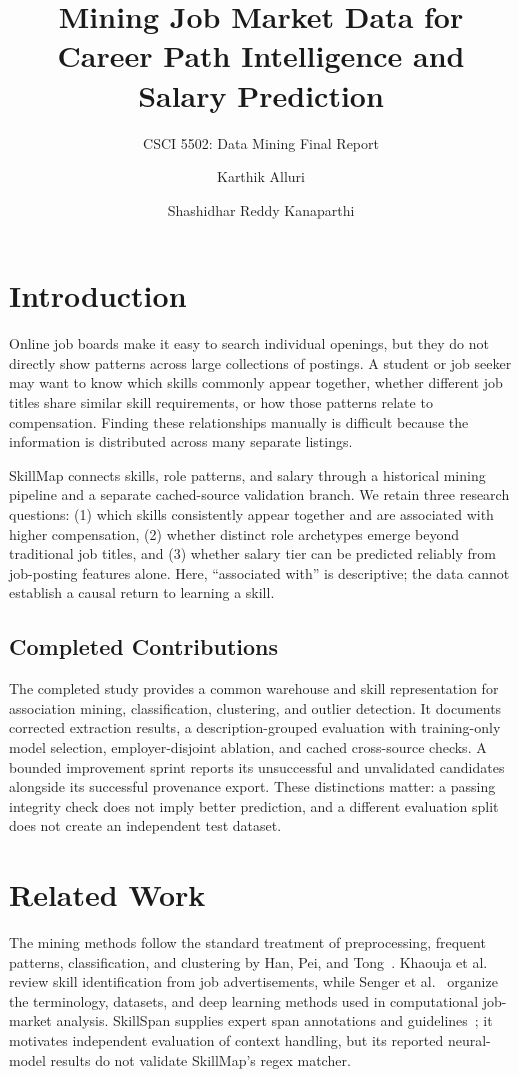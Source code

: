 \documentclass[sigconf,nonacm]{acmart}
\title{Mining Job Market Data for Career Path Intelligence and Salary Prediction}
\subtitle{CSCI 5502: Data Mining Final Report}
\author{Karthik Alluri}
\affiliation{%
  \institution{University of Colorado Boulder}
  \city{Boulder}
  \state{Colorado}
  \country{USA}}
\author{Shashidhar Reddy Kanaparthi}
\affiliation{%
  \institution{University of Colorado Boulder}
  \city{Boulder}
  \state{Colorado}
  \country{USA}}
\begin{document}
\maketitle

\section{Introduction}
Online job boards make it easy to search individual openings, but they do not directly show patterns across large collections of postings. A student or job seeker may want to know which skills commonly appear together, whether different job titles share similar skill requirements, or how those patterns relate to compensation. Finding these relationships manually is difficult because the information is distributed across many separate listings.

SkillMap connects skills, role patterns, and salary through a historical mining pipeline and a separate cached-source validation branch. We retain three research questions: (1) which skills consistently appear together and are associated with higher compensation, (2) whether distinct role archetypes emerge beyond traditional job titles, and (3) whether salary tier can be predicted reliably from job-posting features alone. Here, ``associated with'' is descriptive; the data cannot establish a causal return to learning a skill.

\subsection{Completed Contributions}
The completed study provides a common warehouse and skill representation for association mining, classification, clustering, and outlier detection. It documents corrected extraction results, a description-grouped evaluation with training-only model selection, employer-disjoint ablation, and cached cross-source checks. A bounded improvement sprint reports its unsuccessful and unvalidated candidates alongside its successful provenance export. These distinctions matter: a passing integrity check does not imply better prediction, and a different evaluation split does not create an independent test dataset.

\section{Related Work}
The mining methods follow the standard treatment of preprocessing, frequent patterns, classification, and clustering by Han, Pei, and Tong~\cite{han2023}. Khaouja et al.~\cite{khaouja2021} review skill identification from job advertisements, while Senger et al.~\cite{senger2024} organize the terminology, datasets, and deep learning methods used in computational job-market analysis. SkillSpan supplies expert span annotations and guidelines~\cite{skillspan2022}; it motivates independent evaluation of context handling, but its reported neural-model results do not validate SkillMap's regex matcher.
\end{document}
